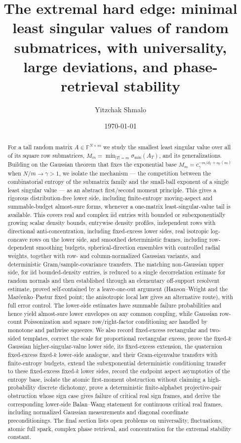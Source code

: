 \documentclass[11pt,reqno]{amsart}
\title[The extremal hard edge]{The extremal hard edge: minimal least singular values
of random submatrices, with universality, large deviations, and phase-retrieval stability}
\author{Yitzchak Shmalo}
\date{\today}
\theoremstyle{plain}
\theoremstyle{definition}
\theoremstyle{remark}
\newcommand{\F}{\mathbb{F}}
\newcommand{\PP}{\mathbb{P}}
\newcommand{\smin}{\sigma_{\min}}
\begin{document}
\begin{abstract}
For a tall random matrix $A\in\F^{N\times m}$ we study the smallest least singular value over
all of its square row submatrices, $M_m=\min_{|T|=m}\smin(A_T)$, and its generalizations.
Building on the Gaussian theorem that fixes the exponential base $M_m=c_\gamma^{-m/d_\F+o_\PP(m)}$
when $N/m\to\gamma>1$, we isolate the mechanism --- the competition between the combinatorial
entropy of the submatrix family and the small-ball exponent of a single least
singular value --- as an abstract first/second moment principle.  This gives a
  rigorous distribution-free lower side, including finite-entropy moving-aspect
  and summable-budget almost-sure forms, whenever a one-matrix least-singular-value
  tail is available.  This covers
  real and complex iid entries with bounded or
  subexponentially growing scalar density bounds, entrywise density profiles,
  independent rows with directional anti-concentration, including fixed-excess
  lower sides, real isotropic log-concave rows on the lower side, and smoothed
  deterministic frames,
  including row-dependent smoothing budgets, spherical-direction ensembles with
  controlled radial weights, together with row- and column-normalized Gaussian
  variants, and deterministic Gram/sample-covariance transfers.  The matching
  non-Gaussian upper side, for iid bounded-density entries, is reduced to a single
  decorrelation estimate for random normals and then established through an
  elementary off-support resolvent estimate, proved self-contained by a
  leave-one-out argument (Hanson--Wright and the Mar\v{c}enko--Pastur fixed point;
  the anisotropic local law gives an alternative route), with full error control.  The lower-side estimates have
summable failure probabilities and hence yield almost-sure lower envelopes on
any common coupling, while Gaussian row-count Poissonization and square
row/right-factor conditioning are handled by monotone and pathwise squeezes.
We also record fixed-excess
rectangular and two-sided templates, correct the scale for proportional
rectangular excess, prove the fixed-\(k\) Gaussian higher-singular-value lower
  side, its fixed-excess extension, the quaternion fixed-excess fixed-\(k\)
  lower-side analogue, and their Gram-eigenvalue transfers with finite-entropy
  budgets, extend the subexponential deterministic conditioning
transfer to these fixed-excess fixed-\(k\) lower sides, record the
endpoint aspect asymptotics of the entropy base,
isolate the atomic first-moment obstruction without claiming
a high-probability discrete dichotomy, prove a deterministic finite-alphabet
projective-pair obstruction whose sign case gives failure of critical real sign
frames, and derive the corresponding lower-side Balan--Wang statement for
continuous critical real frames, including normalized Gaussian measurements and
diagonal coordinate preconditionings.  The final section lists open problems on
universality, fluctuations, atomic full spark, complex phase retrieval, and
concentration for the extremal stability constant.
\end{abstract}
\maketitle
\end{document}

